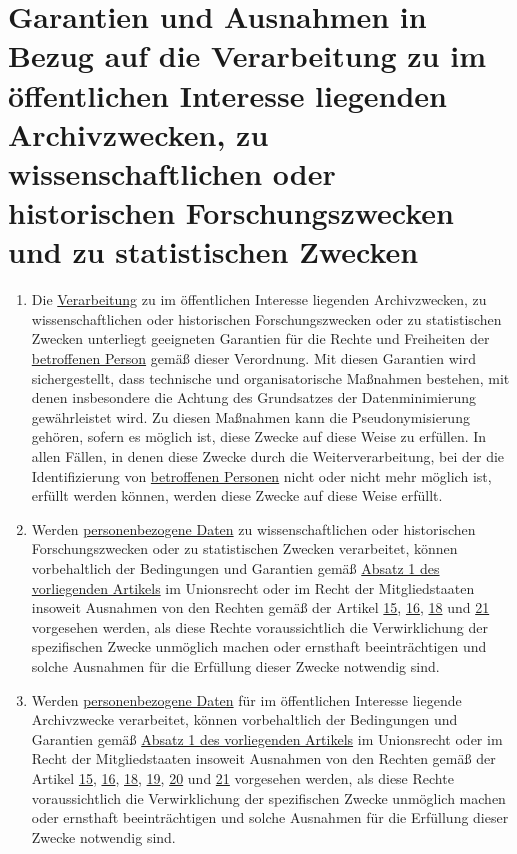 \chapter{Garantien und Ausnahmen in Bezug auf die Verarbeitung zu im öffentlichen Interesse liegenden Archivzwecken, zu
 wissenschaftlichen oder historischen Forschungszwecken und zu statistischen Zwecken}
\label{ch:89}


\begin{enumerate}

  \item Die \hyperref[itm:04-2]{Verarbeitung} zu im öffentlichen Interesse liegenden Archivzwecken, zu wissenschaftlichen oder historischen
   Forschungszwecken oder zu statistischen Zwecken unterliegt geeigneten Garantien für die Rechte und Freiheiten der
   \hyperref[itm:04-1]{betroffenen Person} gemäß dieser Verordnung. Mit diesen Garantien wird sichergestellt, dass technische und
   organisatorische Maßnahmen bestehen, mit denen insbesondere die Achtung des Grundsatzes der Datenminimierung
   gewährleistet wird. Zu diesen Maßnahmen kann die Pseudonymisierung gehören, sofern es möglich ist, diese Zwecke auf
   diese Weise zu erfüllen. In allen Fällen, in denen diese Zwecke durch die Weiterverarbeitung, bei der die
   Identifizierung von \hyperref[itm:04-1]{betroffenen Personen} nicht oder nicht mehr möglich ist, erfüllt werden können, werden diese
   Zwecke auf diese Weise erfüllt.
  \label{itm:89-1}

  \item Werden \hyperref[itm:04-1]{personenbezogene Daten} zu wissenschaftlichen oder historischen Forschungszwecken oder zu statistischen
   Zwecken verarbeitet, können vorbehaltlich der Bedingungen und Garantien gemäß \hyperref[itm:89-1]{Absatz 1 des
   vorliegenden Artikels} im Unionsrecht oder im Recht der Mitgliedstaaten insoweit Ausnahmen von den Rechten gemäß der
   Artikel \hyperref[ch:15]{15}, \hyperref[ch:16]{16}, \hyperref[ch:18]{18} und \hyperref[ch:21]{21} vorgesehen werden,
   als diese Rechte voraussichtlich die Verwirklichung der spezifischen Zwecke unmöglich machen oder ernsthaft
   beeinträchtigen und solche Ausnahmen für die Erfüllung dieser Zwecke notwendig sind.
  \label{itm:89-2}

  \item Werden \hyperref[itm:04-1]{personenbezogene Daten} für im öffentlichen Interesse liegende Archivzwecke verarbeitet, können
   vorbehaltlich der Bedingungen und Garantien gemäß \hyperref[itm:89-1]{Absatz 1 des vorliegenden Artikels} im
   Unionsrecht oder im Recht der Mitgliedstaaten insoweit Ausnahmen von den Rechten gemäß der Artikel \hyperref[ch:15]
   {15}, \hyperref[ch:16]{16}, \hyperref[ch:18]{18}, \hyperref[ch:19]{19}, \hyperref[ch:20]{20} und \hyperref[ch:21]
   {21} vorgesehen werden, als diese Rechte voraussichtlich die Verwirklichung der spezifischen Zwecke unmöglich machen
   oder ernsthaft beeinträchtigen und solche Ausnahmen für die Erfüllung dieser Zwecke notwendig sind.
  \label{itm:89-3}


\end{enumerate}
